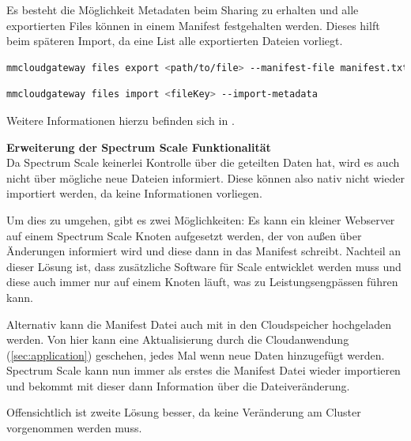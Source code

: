 Es besteht die Möglichkeit Metadaten beim Sharing zu erhalten und alle exportierten Files können in einem Manifest festgehalten werden. Dieses hilft beim späteren Import, da eine List alle exportierten Dateien vorliegt. 

\begin{lstlisting}[language=bash, caption=Export von lokalen Dateien]
mmcloudgateway files export <path/to/file> --manifest-file manifest.txt --export-metadata
\end{lstlisting}

\begin{lstlisting}[language=bash, caption=Import von COS Dateien]
mmcloudgateway files import <fileKey> --import-metadata
\end{lstlisting}

Weitere Informationen hierzu befinden sich in \cite[S. 613]{ibmadmin.2017}.

\textbf{Erweiterung der Spectrum Scale Funktionalität}\\
Da Spectrum Scale keinerlei Kontrolle über die geteilten Daten hat, wird es auch nicht über mögliche neue Dateien informiert. Diese können also nativ nicht wieder importiert werden, da keine Informationen vorliegen.

Um dies zu umgehen, gibt es zwei Möglichkeiten: Es kann ein kleiner Webserver auf einem Spectrum Scale Knoten aufgesetzt werden, der von außen über Änderungen informiert wird und diese dann in das Manifest schreibt. Nachteil an dieser Lösung ist, dass zusätzliche Software für Scale entwicklet werden muss und diese auch immer nur auf einem Knoten läuft, was zu Leistungsengpässen führen kann.

Alternativ kann die Manifest Datei auch mit in den Cloudspeicher hochgeladen werden. Von hier kann eine Aktualisierung durch die Cloudanwendung (\autoref{sec:application}) geschehen, jedes Mal wenn neue Daten hinzugefügt werden. Spectrum Scale kann nun immer als erstes die Manifest Datei wieder importieren und bekommt mit dieser dann Information über die Dateiveränderung.

Offensichtlich ist zweite Lösung besser, da keine Veränderung am Cluster vorgenommen werden muss.